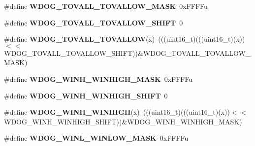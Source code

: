 \begin{DoxyCompactItemize}
\item 
\#define {\bfseries W\+D\+O\+G\+\_\+\+T\+O\+V\+A\+L\+L\+\_\+\+T\+O\+V\+A\+L\+L\+O\+W\+\_\+\+M\+A\+SK}~0x\+F\+F\+F\+Fu\hypertarget{group__WDOG__Register__Masks_ga71c3913b6be99b211a3c3031caf8ac66}{}\label{group__WDOG__Register__Masks_ga71c3913b6be99b211a3c3031caf8ac66}

\item 
\#define {\bfseries W\+D\+O\+G\+\_\+\+T\+O\+V\+A\+L\+L\+\_\+\+T\+O\+V\+A\+L\+L\+O\+W\+\_\+\+S\+H\+I\+FT}~0\hypertarget{group__WDOG__Register__Masks_ga57ba2617b2855cd4b3d1eb0b3c878f52}{}\label{group__WDOG__Register__Masks_ga57ba2617b2855cd4b3d1eb0b3c878f52}

\item 
\#define {\bfseries W\+D\+O\+G\+\_\+\+T\+O\+V\+A\+L\+L\+\_\+\+T\+O\+V\+A\+L\+L\+OW}(x)~(((uint16\+\_\+t)(((uint16\+\_\+t)(x))$<$$<$W\+D\+O\+G\+\_\+\+T\+O\+V\+A\+L\+L\+\_\+\+T\+O\+V\+A\+L\+L\+O\+W\+\_\+\+S\+H\+I\+FT))\&W\+D\+O\+G\+\_\+\+T\+O\+V\+A\+L\+L\+\_\+\+T\+O\+V\+A\+L\+L\+O\+W\+\_\+\+M\+A\+SK)\hypertarget{group__WDOG__Register__Masks_gae42e2ff7aef835ab2b6fa0d6f7a33476}{}\label{group__WDOG__Register__Masks_gae42e2ff7aef835ab2b6fa0d6f7a33476}

\item 
\#define {\bfseries W\+D\+O\+G\+\_\+\+W\+I\+N\+H\+\_\+\+W\+I\+N\+H\+I\+G\+H\+\_\+\+M\+A\+SK}~0x\+F\+F\+F\+Fu\hypertarget{group__WDOG__Register__Masks_ga6efef6fddbc8b8600a8dee5a24659068}{}\label{group__WDOG__Register__Masks_ga6efef6fddbc8b8600a8dee5a24659068}

\item 
\#define {\bfseries W\+D\+O\+G\+\_\+\+W\+I\+N\+H\+\_\+\+W\+I\+N\+H\+I\+G\+H\+\_\+\+S\+H\+I\+FT}~0\hypertarget{group__WDOG__Register__Masks_ga362e7a13b632027b940135991c9d169b}{}\label{group__WDOG__Register__Masks_ga362e7a13b632027b940135991c9d169b}

\item 
\#define {\bfseries W\+D\+O\+G\+\_\+\+W\+I\+N\+H\+\_\+\+W\+I\+N\+H\+I\+GH}(x)~(((uint16\+\_\+t)(((uint16\+\_\+t)(x))$<$$<$W\+D\+O\+G\+\_\+\+W\+I\+N\+H\+\_\+\+W\+I\+N\+H\+I\+G\+H\+\_\+\+S\+H\+I\+FT))\&W\+D\+O\+G\+\_\+\+W\+I\+N\+H\+\_\+\+W\+I\+N\+H\+I\+G\+H\+\_\+\+M\+A\+SK)\hypertarget{group__WDOG__Register__Masks_gaf5dc50c489d2700bf95ffdfa849f9e24}{}\label{group__WDOG__Register__Masks_gaf5dc50c489d2700bf95ffdfa849f9e24}

\item 
\#define {\bfseries W\+D\+O\+G\+\_\+\+W\+I\+N\+L\+\_\+\+W\+I\+N\+L\+O\+W\+\_\+\+M\+A\+SK}~0x\+F\+F\+F\+Fu\hypertarget{group__WDOG__Register__Masks_gadc36bfdccd5e9c14d063a5b36b6a3f6a}{}\label{group__WDOG__Register__Masks_gadc36bfdccd5e9c14d063a5b36b6a3f6a}


\end{DoxyCompactItemize}
